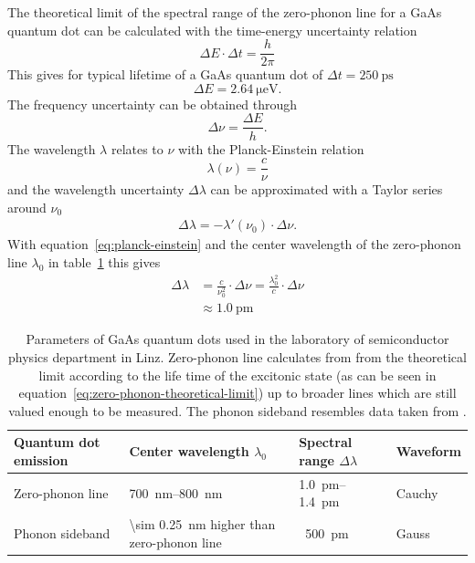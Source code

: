 The theoretical limit of the spectral range of the zero-phonon line for a GaAs quantum dot can be calculated with the time-energy uncertainty relation
\begin{equation}
\Delta E \cdot \Delta t = \frac{h}{2 \pi}
\end{equation}
This gives for typical lifetime of a GaAs quantum dot of $\Delta t = \SI{250}{\pico \second}$
\begin{equation}
\Delta E = \SI{2.64}{\micro \electronvolt}.
\end{equation}
The frequency uncertainty can be obtained through
\begin{equation}
\label{eq:planck-einstein}
\Delta \nu = \frac{\Delta E}{h}.
\end{equation}
The wavelength $\lambda$ relates to $\nu$ with the Planck-Einstein relation 
\begin{equation}
\lambda(\nu) = \frac{c}{\nu}
\end{equation}
and the wavelength uncertainty $\Delta \lambda$ can be approximated with a Taylor series around $\nu_0$
\begin{align}
\Delta \lambda = - \lambda'(\nu_0)\cdot \Delta \nu.
\end{align}
With equation~\eqref{eq:planck-einstein} and the center wavelength of the zero-phonon line $\lambda_{0}$ in table~\ref{tab:quantum-dot-emission} this gives
\begin{align}
\Delta \lambda &= \frac{c}{\nu_0^2} \cdot \Delta \nu = \frac{\lambda_0^2}{c}\cdot\Delta \nu\\
\label{eq:zero-phonon-theoretical-limit}
&\approx \SI{1.0}{\pico \metre}
\end{align}


\begin{table}[H]
	\caption[Paramters of GaAs quantum dots used in the laboratory of semiconductor physics department in Linz.]{Parameters of GaAs quantum dots used in the laboratory of semiconductor physics department in Linz.
		Zero-phonon line calculates from from the theoretical limit according to the life time of the excitonic state (as can be seen in equation~\eqref{eq:zero-phonon-theoretical-limit}) up to broader lines which are still valued enough to be measured.
		The phonon sideband resembles data taken from \textcite{scholl_resonance_2019}.}
	\label{tab:quantum-dot-emission}
	\begin{tabular}{@{}llll@{}}
		\toprule
		Quantum dot emission & Center wavelength $\lambda_0$           & Spectral range $\Delta \lambda$ & Waveform                  \\ \midrule
		Zero-phonon line               & \SIrange{700}{800}{\nano \metre} & \SIrange{1.0}{1.4}{\pico \metre} & Cauchy\\
		Phonon sideband       & \SI{\sim 0.25}{\nano \metre} higher than zero-phonon line  & ~\SI{500}{\pico \metre} & Gauss  \\ \bottomrule
	\end{tabular}
\end{table}

